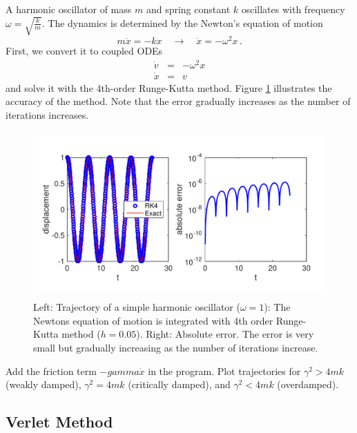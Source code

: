 \begin{example}\label{ex:harmonic_oscillator1}  
A harmonic oscillator of mass $m$ and spring constant $k$ oscillates with frequency $\omega=\sqrt{\frac{k}{m}}$.  The dynamics is determined by the Newton's equation of motion
\begin{equation}
m \ddot{x} = - k x  \quad \rightarrow \quad \ddot{x} = -\omega^2 x\, .
\end{equation}
First, we convert it to coupled ODEs
\begin{subequations}
\begin{eqnarray}
\dot{v} &=& - \omega^2 x \\
\dot{x} &=& v
\end{eqnarray}
\end{subequations}
and solve it with the 4th-order Runge-Kutta method. Figure \ref{fig:harmonic_oscillator1} illustrates the accuracy of the method.  Note that the error gradually increases as the number of iterations increases.

\begin{figure}
\centerline{\includegraphics[height=2.5in]{05.ode1/harmonic_oscillator1.pdf}}
\caption{Left: Trajectory of a simple harmonic oscillator ($\omega=1$): The Newtons equation of motion is integrated with 4th order Runge-Kutta method ($h=0.05$).  Right: Absolute error. The error is very small but gradually increasing as the number of iterations increase. }
\label{fig:harmonic_oscillator1}
\end{figure}

\exercise
Add the friction term $-gamma \dot{x}$ in the program.  Plot trajectories for $\gamma^2 > 4 m k$ (weakly damped), $\gamma^2=4 m k$ (critically damped), and $\gamma^2 < 4 m k$ (overdamped).
\end{example}


\noindent
\subsection{Verlet Method}

